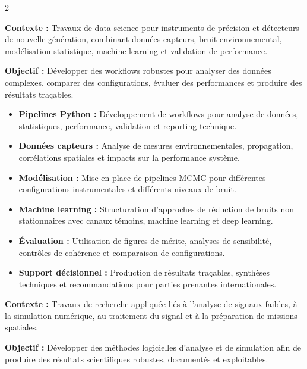 \documentclass[8pt,a4paper,ragged2e,withhyper]{altacv}
\begin{document}
\begin{paracol}{2}
\divider


\textbf{Contexte :} Travaux de data science pour instruments de précision et détecteurs de nouvelle génération, combinant données capteurs, bruit environnemental, modélisation statistique, machine learning et validation de performance.

\textbf{Objectif :} Développer des workflows robustes pour analyser des données complexes, comparer des configurations, évaluer des performances et produire des résultats traçables.

\begin{itemize}
  \item \textbf{Pipelines Python :} Développement de workflows pour analyse de données, statistiques, performance, validation et reporting technique.
  \item \textbf{Données capteurs :} Analyse de mesures environnementales, propagation, corrélations spatiales et impacts sur la performance système.
  \item \textbf{Modélisation :} Mise en place de pipelines MCMC pour différentes configurations instrumentales et différents niveaux de bruit.
  \item \textbf{Machine learning :} Structuration d’approches de réduction de bruits non stationnaires avec canaux témoins, machine learning et deep learning.
  \item \textbf{Évaluation :} Utilisation de figures de mérite, analyses de sensibilité, contrôles de cohérence et comparaison de configurations.
  \item \textbf{Support décisionnel :} Production de résultats traçables, synthèses techniques et recommandations pour parties prenantes internationales.
\end{itemize}

\divider


\textbf{Contexte :} Travaux de recherche appliquée liés à l’analyse de signaux faibles, à la simulation numérique, au traitement du signal et à la préparation de missions spatiales.

\textbf{Objectif :} Développer des méthodes logicielles d’analyse et de simulation afin de produire des résultats scientifiques robustes, documentés et exploitables.


\end{paracol}
\end{document}
